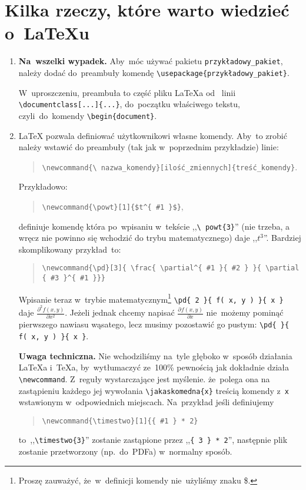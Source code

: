 \documentclass[a4paper,11pt]{article}
\newcommand{\tbs}{\textbackslash}  %
\newcommand{\tb}{\textbf}
\newcommand{\powt}[1]{$t^{ #1 }$}
\newcommand{\pd}[3]{ \frac{ \partial^{ #1 } { #2 } }
  { \partial { #3 }^{ #1 } } }
\begin{document}
\section{Kilka rzeczy, które warto wiedzieć o~\LaTeX u}
\label{sec:kilkarzeczy}

\begin{enumerate}
\item \tb{Na~wszelki wypadek.} Aby~móc używać pakietu
  \texttt{przykładowy\_pakiet}, należy dodać do~preambuły komendę
  \texttt{\tbs usepackage\{przykładowy\_pakiet\}}.

  W~uproszczeniu, preambuła to część pliku \LaTeX a od~ linii
  \texttt{\tbs documentclass[...]\{...\}}, do~początku właściwego
  tekstu, czyli~do~komendy \texttt{\tbs begin\{document\}}.
\item \LaTeX{} pozwala definiować użytkownikowi własne komendy. Aby~to
  zrobić należy wstawić do preambuły (tak jak w~poprzednim
  przykładzie) linie:
  \begin{quote}
    \texttt{\tbs newcommand\{\tbs
      nazwa\_komendy\}[ilość\_zmiennych]\{treść\_komendy\}}.
  \end{quote}
  Przykładowo:
  \begin{quote}
    \texttt{\tbs newcommand\{\tbs powt\}}\verb+[1]{$t^{ #1 }$}+,
  \end{quote}
  definiuje komendę która po~wpisaniu w~tekście ,,\texttt{\tbs
    powt\{3\}}'' (nie trzeba, a wręcz nie powinno się wchodzić do
  trybu matematycznego) daje ,,\powt{3}''. Bardziej skomplikowany
  przykład~to:
  \begin{quote}
    \texttt{\tbs newcommand\{\tbs pd\}}\verb+[3]+\texttt{\{ \tbs frac\{ \tbs partial\^{}\{ \#1 \}\{ \#2 \} \}}\texttt{\{ \tbs partial \{ \#3 \}\^{}\{ \#1 \}\}\}}
  \end{quote}
  Wpisanie teraz w~trybie matematycznym\footnote{Proszę zauważyć,
    że~w~definicji komendy nie~użyliśmy znaku \$.} \texttt{\tbs pd\{ 2
    \}\{ f( x, y ) \}\{ x \}} daje $\pd{ 2 }{ f( x, y ) }{ x }$.
  Jeżeli jednak chcemy napisać $\pd{}{ f( x, y ) }{ x }$ nie~możemy
  pominąć pierwszego nawiasu wąsatego, lecz musimy pozostawić go
  pustym: \texttt{\tbs pd\{ \}\{ f( x, y ) \}\{ x \}}.

  \textbf{Uwaga techniczna.} Nie wchodziliśmy na~tyle głęboko w~sposób
  działania \LaTeX a i~\TeX a, by~wytłumaczyć ze~100\% pewnością jak
  dokładnie działa \texttt{\tbs newcommand}. Z~reguły wystarczające
  jest myślenie. że~polega ona na zastąpieniu każdego jej wywołania
  \texttt{\tbs jakaskomedna\{x\}} treścią komendy z~\texttt{x}
  wstawionym w~odpowiednich miejscach. Na~przykład jeśli definiujemy
  \begin{quote}
    \texttt{\tbs newcommand\{\tbs timestwo\}[1]\{\{ \#1 \} * 2\}}
  \end{quote}
  to~,,\texttt{\tbs timestwo\{3\}}'' zostanie zastąpione przez
  ,,\texttt{\{ 3 \} * 2}'', następnie plik zostanie przetworzony
  (np.~do~PDFa) w~normalny sposób.


\end{enumerate}
\end{document}
